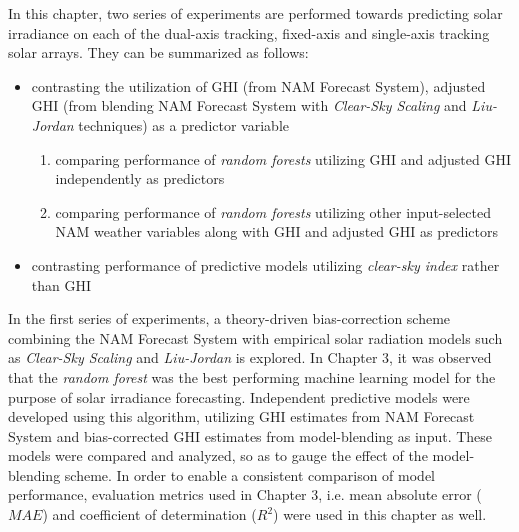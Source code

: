 \par In this chapter, two series of experiments are performed towards predicting solar irradiance on each of the dual-axis tracking, fixed-axis and single-axis tracking solar arrays. They can be summarized as follows:
\begin{itemize}[noitemsep]
    \item contrasting the utilization of GHI (from NAM Forecast System), adjusted GHI (from blending NAM Forecast System with \textit{Clear-Sky Scaling} and \textit{Liu-Jordan} techniques) as a predictor variable
    \begin{enumerate}[label=(\alph*)]
        \item comparing performance of \textit{random forests} utilizing GHI and adjusted GHI independently as predictors
        \item comparing performance of \textit{random forests} utilizing other input-selected NAM weather variables along with GHI and adjusted GHI as predictors
    \end{enumerate}
    \item contrasting performance of predictive models utilizing \textit{clear-sky index} rather than GHI
\end{itemize}


\par In the first series of experiments, a theory-driven bias-correction scheme combining the NAM Forecast System with empirical solar radiation models such as \textit{Clear-Sky Scaling} and \textit{Liu-Jordan} is explored. In Chapter 3, it was observed that the \textit{random forest} was the best performing machine learning model for the purpose of solar irradiance forecasting. Independent predictive models were developed using this algorithm, utilizing GHI estimates from NAM Forecast System and bias-corrected GHI estimates from model-blending as input. These models were compared and analyzed, so as to gauge the effect of the model-blending scheme. In order to enable a consistent comparison of model performance, evaluation metrics used in Chapter 3, i.e. mean absolute error ($MAE$) and coefficient of determination ($R^2$) were used in this chapter as well. 

